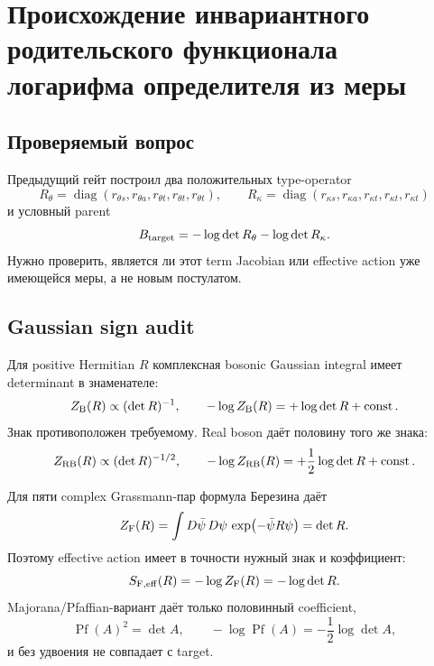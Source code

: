 \chapter{Происхождение инвариантного родительского функционала логарифма определителя из меры}
\label{ch:v9-endpoint-kms-logdet-measure-origin}

\section{Проверяемый вопрос}

Предыдущий гейт построил два положительных type-operator
\begin{equation}
 R_\theta=\operatorname{diag}(r_{\theta s},r_{\theta a},
 r_{\theta t},r_{\theta t},r_{\theta t}),
 \qquad
 R_\kappa=\operatorname{diag}(r_{\kappa s},r_{\kappa a},
 r_{\kappa t},r_{\kappa t},r_{\kappa t})
 \label{eq:v9-kms-logdet-measure-type-operators}
\end{equation}
и условный parent
\begin{equation}
 B_{\rm target}=-\log\det R_\theta-\log\det R_\kappa.
 \label{eq:v9-kms-logdet-measure-target}
\end{equation}
Нужно проверить, является ли этот term Jacobian или effective action уже
имеющейся меры, а не новым постулатом.

\section{Gaussian sign audit}

Для positive Hermitian $R$ комплексная bosonic Gaussian integral имеет
determinant в знаменателе:
\begin{equation}
 Z_{\rm B}(R)\propto(\det R)^{-1},
 \qquad
 -\log Z_{\rm B}(R)=+\log\det R+\operatorname{const}.
 \label{eq:v9-kms-logdet-measure-complex-boson}
\end{equation}
Знак противоположен требуемому. Real boson даёт половину того же знака:
\begin{equation}
 Z_{\rm RB}(R)\propto(\det R)^{-1/2},
 \qquad
 -\log Z_{\rm RB}(R)=+\frac12\log\det R+\operatorname{const}.
 \label{eq:v9-kms-logdet-measure-real-boson}
\end{equation}

Для пяти complex Grassmann-пар формула Березина даёт
\begin{equation}
 Z_{\rm F}(R)=
 \int D\bar\psi\,D\psi\,
 \exp\!\left(-\bar\psi R\psi\right)=\det R.
 \label{eq:v9-kms-logdet-measure-berezin}
\end{equation}
Поэтому effective action имеет в точности нужный знак и коэффициент:
\begin{equation}
 S_{\rm F,eff}(R)=-\log Z_{\rm F}(R)=-\log\det R.
 \label{eq:v9-kms-logdet-measure-fermion-sign}
\end{equation}
Majorana/Pfaffian-вариант даёт только половинный coefficient,
\begin{equation}
 \operatorname{Pf}(A)^2=\det A,
 \qquad
 -\log\operatorname{Pf}(A)=-\frac12\log\det A,
 \label{eq:v9-kms-logdet-measure-pfaffian}
\end{equation}
и без удвоения не совпадает с target.

